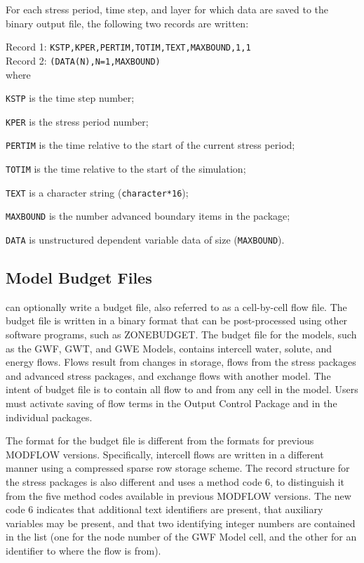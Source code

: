 For each stress period, time step, and layer for which data are saved to the binary output file, the following two records are written:

\vspace{5mm}
\noindent Record 1: \texttt{KSTP,KPER,PERTIM,TOTIM,TEXT,MAXBOUND,1,1} \\
\noindent Record 2: \texttt{(DATA(N),N=1,MAXBOUND)} \\

\vspace{5mm}
\noindent where

\begin{description} \itemsep0pt \parskip0pt 
\item \texttt{KSTP} is the time step number;
\item \texttt{KPER} is the stress period number;
\item \texttt{PERTIM} is the time relative to the start of the current stress period; 
\item \texttt{TOTIM} is the time relative to the start of the simulation;
\item \texttt{TEXT} is a character string (\texttt{character*16});
\item \texttt{MAXBOUND} is the number advanced boundary items in the package;
\item \texttt{DATA} is unstructured dependent variable data of size (\texttt{MAXBOUND}).
\end{description}


\newpage
\subsection{Model Budget Files}
\mf can optionally write a budget file, also referred to as a cell-by-cell flow file.  The budget file is written in a binary format that can be post-processed using other software programs, such as ZONEBUDGET.  The budget file for the \mf models, such as the GWF, GWT, and GWE Models, contains intercell water, solute, and energy flows.  Flows result from changes in storage, flows from the stress packages and advanced stress packages, and exchange flows with another model.  The intent of budget file is to contain all flow to and from any cell in the model.  Users must activate saving of flow terms in the Output Control Package and in the individual packages.  

The format for the budget file is different from the formats for previous MODFLOW versions.  Specifically, intercell flows are written in a different manner using a compressed sparse row storage scheme.  The record structure for the stress packages is also different and uses a method code 6, to distinguish it from the five method codes available in previous MODFLOW versions.  The new code 6 indicates that additional text identifiers are present, that auxiliary variables may be present, and that two identifying integer numbers are contained in the list (one for the node number of the GWF Model cell, and the other for an identifier to where the flow is from).  

